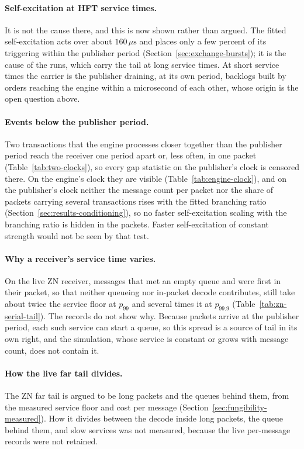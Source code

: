 \documentclass[11pt]{article}
\begin{document}
\paragraph{Self-excitation at HFT service times.} It is not the cause there, and this is
now shown rather than argued. The fitted self-excitation acts over about
$160\,\mu\mathrm{s}$ and places only a few percent of its triggering within the publisher period (Section~\ref{sec:exchange-bursts}); it is the cause of the runs, which carry the
tail at long service times. At short service times the carrier is the publisher draining, at its own period, backlogs built by orders reaching the engine within a microsecond of
each other, whose origin is the open question above.

\paragraph{Events below the publisher period.} Two transactions that the engine processes
closer together than the publisher period reach the receiver one period apart or, less
often, in one packet (Table~\ref{tab:two-clocks}), so every gap statistic on the
publisher's clock is censored there. On the engine's clock they are visible
(Table~\ref{tab:engine-clock}), and on the publisher's clock neither the message count per
packet nor the share of packets carrying several transactions rises with the fitted
branching ratio (Section~\ref{sec:results-conditioning}), so no faster self-excitation
scaling with the branching ratio is hidden in the packets. Faster self-excitation of
constant strength would not be seen by that test.

\paragraph{Why a receiver's service time varies.} On the live ZN receiver, messages that
met an empty queue and were first in their packet, so that neither queueing nor in-packet
decode contributes, still take about twice the service floor at $p_{99}$ and several times
it at $p_{99.9}$ (Table~\ref{tab:zn-serial-tail}). The records do not show why. Because
packets arrive at the publisher period, each such service can start a queue, so this
spread is a source of tail in its own right, and the simulation, whose service is constant
or grows with message count, does not contain it.

\paragraph{How the live far tail divides.} The ZN far tail is argued to be long packets
and the queues behind them, from the measured service floor and cost per message
(Section~\ref{sec:fungibility-measured}). How it divides between the decode inside long
packets, the queue behind them, and slow services was not measured, because the live
per-message records were not retained.
\end{document}
